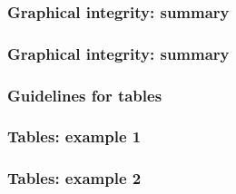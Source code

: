 \documentclass[12pt, 
hyperref={colorlinks=true, linkcolor=blue, urlcolor=cyan}]{beamer}
\begin{document}
\begin{frame}
\frametitle{Graphical integrity: summary}

\end{frame}


\begin{frame}
\frametitle{Graphical integrity: summary}

\end{frame}


\begin{frame}
\frametitle{Guidelines for tables}

\end{frame}


\begin{frame}
\frametitle{Tables: example 1}

\end{frame}


\begin{frame}
\frametitle{Tables: example 2}

\end{frame}
\end{document}
